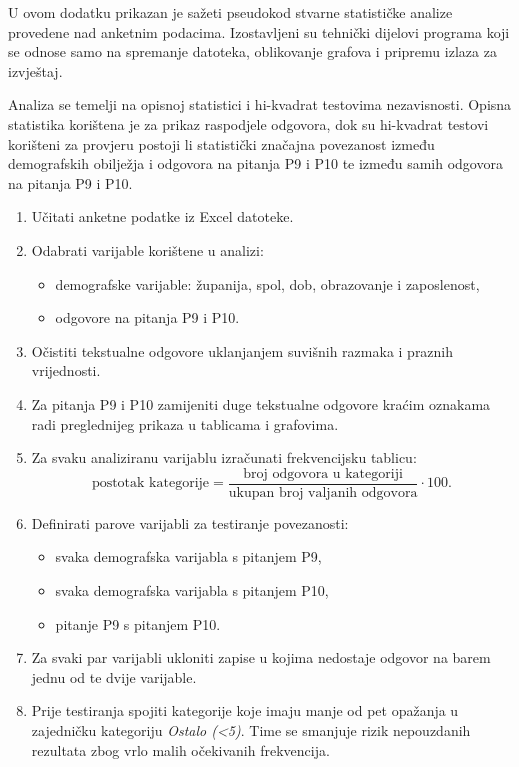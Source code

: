 U ovom dodatku prikazan je sažeti pseudokod stvarne statističke analize provedene nad anketnim podacima. Izostavljeni su tehnički dijelovi programa koji se odnose samo na spremanje datoteka, oblikovanje grafova i pripremu izlaza za izvještaj.

Analiza se temelji na opisnoj statistici i hi-kvadrat testovima nezavisnosti. Opisna statistika korištena je za prikaz raspodjele odgovora, dok su hi-kvadrat testovi korišteni za provjeru postoji li statistički značajna povezanost između demografskih obilježja i odgovora na pitanja P9 i P10 te između samih odgovora na pitanja P9 i P10.

\begin{enumerate}[label=\textbf{Korak \arabic*:}, leftmargin=*]
  \item Učitati anketne podatke iz Excel datoteke.
  \item Odabrati varijable korištene u analizi:
  \begin{itemize}[nosep]
    \item demografske varijable: županija, spol, dob, obrazovanje i zaposlenost,
    \item odgovore na pitanja P9 i P10.
  \end{itemize}
  \item Očistiti tekstualne odgovore uklanjanjem suvišnih razmaka i praznih vrijednosti.
  \item Za pitanja P9 i P10 zamijeniti duge tekstualne odgovore kraćim oznakama radi preglednijeg prikaza u tablicama i grafovima.
  \item Za svaku analiziranu varijablu izračunati frekvencijsku tablicu:
  \[
    \text{postotak kategorije} = \frac{\text{broj odgovora u kategoriji}}{\text{ukupan broj valjanih odgovora}} \cdot 100.
  \]
  \item Definirati parove varijabli za testiranje povezanosti:
  \begin{itemize}[nosep]
    \item svaka demografska varijabla s pitanjem P9,
    \item svaka demografska varijabla s pitanjem P10,
    \item pitanje P9 s pitanjem P10.
  \end{itemize}
  \item Za svaki par varijabli ukloniti zapise u kojima nedostaje odgovor na barem jednu od te dvije varijable.
  \item Prije testiranja spojiti kategorije koje imaju manje od pet opažanja u zajedničku kategoriju \textit{Ostalo (<5)}. Time se smanjuje rizik nepouzdanih rezultata zbog vrlo malih očekivanih frekvencija.

\end{enumerate}
